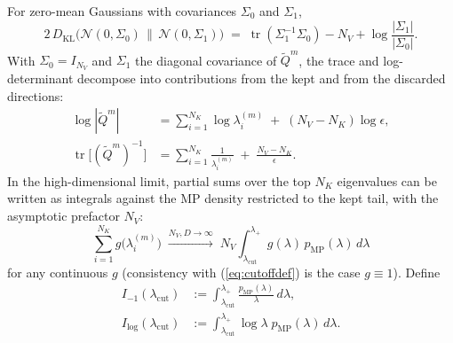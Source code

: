 \documentclass[11pt,a4paper]{article}
\theoremstyle{definition}
\theoremstyle{remark}
\newcommand{\KL}{D_{\mathrm{KL}}}
\newcommand{\NK}{N_K}
\newcommand{\NV}{N_V}
\newcommand{\tr}{\operatorname{tr}}
\begin{document}
For zero-mean Gaussians with covariances $\Sigma_{0}$ and $\Sigma_{1}$,
\begin{equation}
  2\,\KL\!\big(\mathcal{N}(0,\Sigma_{0}) \,\big\|\, \mathcal{N}(0,\Sigma_{1})\big)
  \;=\;
  \tr(\Sigma_{1}^{-1}\Sigma_{0}) - \NV + \log\frac{|\Sigma_{1}|}{|\Sigma_{0}|}.
  \label{eq:gausKL}
\end{equation}
With $\Sigma_{0} = I_{\NV}$ and $\Sigma_{1}$ the diagonal
covariance of $\widetilde{Q}^{m}$, the trace and
log-determinant decompose into contributions from the kept and
from the discarded directions:
\begin{align*}
  \log|\widetilde{Q}^{m}|
  &= \sum_{i=1}^{\NK} \log\lambda_i^{(m)}
   \;+\; (\NV-\NK)\log\epsilon ,
  \\
  \tr\!\big[(\widetilde{Q}^{m})^{-1}\big]
  &= \sum_{i=1}^{\NK} \frac{1}{\lambda_i^{(m)}}
   \;+\; \frac{\NV-\NK}{\epsilon} .
\end{align*}
In the high-dimensional limit, partial sums over the top $\NK$
eigenvalues can be written as integrals against the MP density
restricted to the kept tail, with the asymptotic prefactor $\NV$:
\begin{equation}
  \sum_{i=1}^{\NK} g\!\big(\lambda_i^{(m)}\big)
  \;\xrightarrow{\NV,D\to\infty}\;
  \NV \int_{\lambda_{\mathrm{cut}}}^{\lambda_+}
       g(\lambda)\,p_{\mathrm{MP}}(\lambda)\,d\lambda
  \label{eq:partialsum-MP}
\end{equation}
for any continuous $g$ (consistency with (\ref{eq:cutoffdef}) is
the case $g \equiv 1$). Define
\begin{align}
  I_{-1}(\lambda_{\mathrm{cut}}) &:=
       \int_{\lambda_{\mathrm{cut}}}^{\lambda_{+}}
       \frac{p_{\mathrm{MP}}(\lambda)}{\lambda}\,d\lambda,
  \nonumber \\
  I_{\log}(\lambda_{\mathrm{cut}}) &:=
       \int_{\lambda_{\mathrm{cut}}}^{\lambda_{+}}
       \log\lambda\;p_{\mathrm{MP}}(\lambda)\,d\lambda.
  \label{eq:integralsdef}
\end{align}
\end{document}
